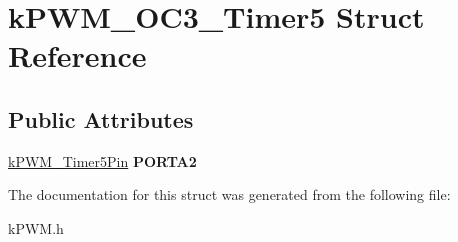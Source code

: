 \hypertarget{structkPWM__OC3__Timer5}{}\section{k\+P\+W\+M\+\_\+\+O\+C3\+\_\+\+Timer5 Struct Reference}
\label{structkPWM__OC3__Timer5}
\subsection*{Public Attributes}
\begin{DoxyCompactItemize}
\item 
\hyperlink{structkPWM__Timer5Pin}{k\+P\+W\+M\+\_\+\+Timer5\+Pin} {\bfseries P\+O\+R\+T\+A2}\hypertarget{structkPWM__OC3__Timer5_a242e1a913b636907a55f56513106d855}{}\label{structkPWM__OC3__Timer5_a242e1a913b636907a55f56513106d855}

\end{DoxyCompactItemize}


The documentation for this struct was generated from the following file\+:\begin{DoxyCompactItemize}
\item 
k\+P\+W\+M.\+h\end{DoxyCompactItemize}
